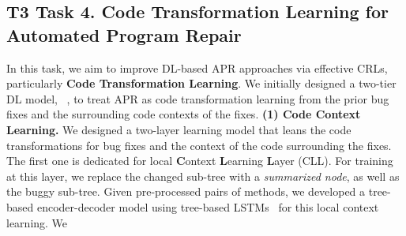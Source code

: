 
\subsection{T3 Task 4. Code Transformation Learning for Automated Program Repair}

In this task, we aim to improve DL-based APR approaches via effective
CRLs, particularly {\bf Code Transformation Learning}.
We initially designed a two-tier DL model, \tool~\cite{icse_fl_20}, to
treat APR as code transformation learning from the prior bug fixes and
the surrounding code contexts of the fixes.
%
{\bf (1) Code Context Learning.} We designed a two-layer learning model
that leans the code transformations for bug fixes and the context of
the code surrounding the fixes. The first one is dedicated for local
\textbf{C}ontext \textbf{L}earning \textbf{L}ayer (CLL).
%
For training at this layer, we replace the changed sub-tree with
a {\em summarized node}, as well as the buggy
sub-tree.  Given pre-processed pairs of methods, we developed a
tree-based encoder-decoder model using tree-based
LSTMs~\cite{tai2015improved} for this local context learning.  We
